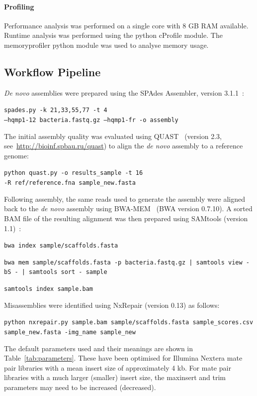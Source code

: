 \paragraph{Profiling}
Performance analysis was performed on a single core with 8 GB RAM available. Runtime analysis was performed using the python cProfile module. The memoryprofiler python module was used to analyse memory usage.

\subsection{Workflow Pipeline}
\textit{De novo} assemblies were prepared using the SPAdes Assembler, version 3.1.1~\cite{Bankevich2012}:

\texttt{spades.py -k 21,33,55,77 -t 4 \\ --hqmp1-12 bacteria.fastq.gz  --hqmp1-fr -o assembly}

The initial assembly quality was evaluated using QUAST~\cite{Gurevich2013} (version 2.3, see~\url{http://bioinf.spbau.ru/quast}) to align the \textit{de novo} assembly to a reference genome:

\texttt{python quast.py -o results\_sample -t 16 \\  -R ref/reference.fna sample\_new.fasta }

  Following assembly, the same reads used to generate the assembly were aligned back to the \textit{de novo} assembly using BWA-MEM~\cite{li2013} (BWA version 0.7.10). A sorted BAM file of the resulting alignment was then prepared using SAMtools (version 1.1)~\cite{li2009}: 

\texttt{bwa index sample/scaffolds.fasta}

\texttt{bwa mem sample/scaffolds.fasta -p bacteria.fastq.gz | samtools view -bS - |  samtools sort - sample}

\texttt{samtools index sample.bam}

Misassemblies were identified using NxRepair (version 0.13) as follows:

\texttt{python nxrepair.py sample.bam   sample/scaffolds.fasta sample\_scores.csv  sample\_new.fasta -img\_name sample\_new}


The default parameters used and their meanings are shown in Table~\ref{tab:parameters}. These have been optimised for Illumina Nextera mate pair libraries with a mean insert size of approximately 4 kb. For mate pair libraries with a much larger (smaller) insert size, the maxinsert and trim parameters may need to be increased (decreased).

